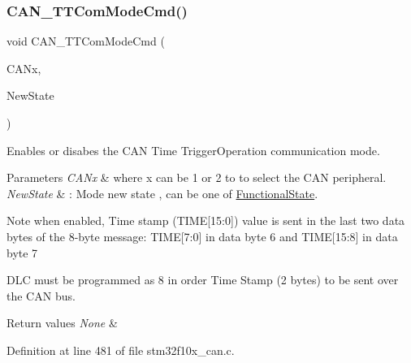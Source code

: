 \subsubsection{\texorpdfstring{C\+A\+N\+\_\+\+T\+T\+Com\+Mode\+Cmd()}{CAN\_TTComModeCmd()}}
{\footnotesize\ttfamily void C\+A\+N\+\_\+\+T\+T\+Com\+Mode\+Cmd (\begin{DoxyParamCaption}\item[{\hyperlink{struct_c_a_n___type_def}{C\+A\+N\+\_\+\+Type\+Def} $\ast$}]{C\+A\+Nx,  }\item[{\hyperlink{group___exported__types_gac9a7e9a35d2513ec15c3b537aaa4fba1}{Functional\+State}}]{New\+State }\end{DoxyParamCaption})}



Enables or disabes the C\+AN Time Trigger\+Operation communication mode. 


\begin{DoxyParams}{Parameters}
{\em C\+A\+Nx} & where x can be 1 or 2 to to select the C\+AN peripheral. \\
\hline
{\em New\+State} & \+: Mode new state , can be one of \hyperlink{group___exported__types_gac9a7e9a35d2513ec15c3b537aaa4fba1}{Functional\+State}. \\
\hline
\end{DoxyParams}
\begin{DoxyNote}{Note}
when enabled, Time stamp (T\+I\+ME\mbox{[}15\+:0\mbox{]}) value is sent in the last two data bytes of the 8-\/byte message\+: T\+I\+ME\mbox{[}7\+:0\mbox{]} in data byte 6 and T\+I\+ME\mbox{[}15\+:8\mbox{]} in data byte 7 

D\+LC must be programmed as 8 in order Time Stamp (2 bytes) to be sent over the C\+AN bus. 
\end{DoxyNote}

\begin{DoxyRetVals}{Return values}
{\em None} & \\
\hline
\end{DoxyRetVals}


Definition at line 481 of file stm32f10x\+\_\+can.\+c.

\mbox{\label{group___c_a_n___exported___functions_ga78cdfbf1884b9e33c552bcbca15bed10}} 
